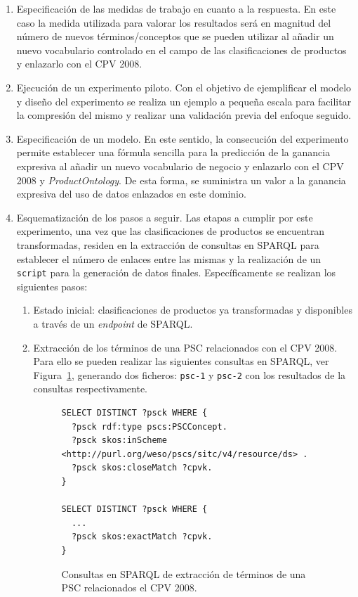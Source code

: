 \begin{enumerate}
 \item Especificación de las medidas de trabajo en cuanto a la respuesta. En este caso la medida utilizada para valorar los resultados 
será en magnitud del número de nuevos términos/conceptos que se pueden utilizar al añadir un nuevo vocabulario controlado en el campo 
de las clasificaciones de productos y enlazarlo con el \gls{CPV} 2008.
 \item Ejecución de un experimento piloto. Con el objetivo de ejemplificar el modelo y diseño del experimento se realiza un 
ejemplo a pequeña escala para facilitar la compresión del mismo y realizar una validación previa del enfoque seguido.
 \item Especificación de un modelo. En este sentido, la consecución del experimento permite establecer una fórmula sencilla 
para la predicción de la ganancia expresiva al añadir un nuevo vocabulario de negocio y enlazarlo con el CPV 2008 y \textit{ProductOntology}. De 
esta forma, se suministra un valor a la ganancia expresiva del uso de datos enlazados en este dominio.
 \item Esquematización de los pasos a seguir. Las etapas a cumplir por este experimento, una vez que las clasificaciones de productos 
se encuentran transformadas, residen en la extracción de consultas en \gls{SPARQL} para establecer el número de enlaces entre las mismas y 
la realización de un \texttt{script} para la generación de datos finales. Específicamente se realizan los siguientes pasos:
\begin{enumerate}
 \item Estado inicial: clasificaciones de productos ya transformadas y disponibles a través de un \textit{endpoint} de SPARQL.
 \item Extracción de los términos de una \gls{PSC} relacionados con el CPV 2008. Para ello se pueden realizar las siguientes consultas 
en SPARQL, ver Figura~\ref{fig:step-1}, generando dos ficheros: \texttt{psc-1} y \texttt{psc-2} con los resultados de la consultas respectivamente.

\begin{figure}[!htp]
\begin{lstlisting}
SELECT DISTINCT ?psck WHERE {
  ?psck rdf:type pscs:PSCConcept.
  ?psck skos:inScheme <http://purl.org/weso/pscs/sitc/v4/resource/ds> .
  ?psck skos:closeMatch ?cpvk.
}

SELECT DISTINCT ?psck WHERE {
  ...
  ?psck skos:exactMatch ?cpvk.
}
\end{lstlisting}
	\caption{Consultas en SPARQL de extracción de términos de una PSC relacionados el CPV 2008.}
	\label{fig:step-1}
\end{figure}


\end{enumerate}
\end{enumerate}
